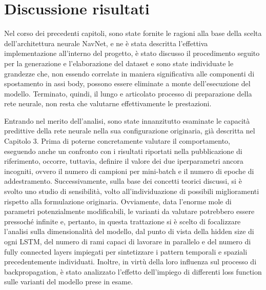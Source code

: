 
\chapter{Discussione risultati}

Nel corso dei precedenti capitoli, sono state fornite le ragioni alla base della scelta dell'architettura neurale NavNet, e ne è stata descritta l'effettiva implementazione all'interno del progetto, è stato discusso il procedimento seguito per la generazione e l'elaborazione del dataset e sono state individuate le grandezze che, non essendo correlate in maniera significativa alle componenti di spostamento in assi body, possono essere eliminate a monte dell'esecuzione del modello. Terminato, quindi, il lungo e articolato processo di preparazione della rete neurale, non resta che valutarne effettivamente le prestazioni. 

Entrando nel merito dell'analisi, sono state innanzitutto esaminate le capacità predittive della rete neurale nella sua configurazione originaria, già descritta nel Capitolo 3. Prima di poterne concretamente valutare il comportamento, eseguendo anche un confronto con i risultati riportati nella pubblicazione di riferimento, occorre, tuttavia, definire il valore dei due iperparametri ancora incogniti, ovvero il numero di campioni per mini-batch e il numero di epoche di addestramento. Successivamente, sulla base dei concetti teorici discussi, si è svolto uno studio di sensibilità, volto all'individuazione di possibili miglioramenti rispetto alla formulazione originaria. Ovviamente, data l'enorme mole di parametri potenzialmente modificabili, le varianti da valutare potrebbero essere pressoché infinite e, pertanto, in questa trattazione si è scelto di focalizzare l'analisi sulla dimensionalità del modello, dal punto di vista della hidden size di ogni LSTM, del numero di rami capaci di lavorare in parallelo e del numero di fully connected layers impiegati per sintetizzare i pattern temporali e spaziali precedentemente individuati. Inoltre, in virtù della loro influenza sul processo di backpropagation, è stato analizzato l'effetto dell'impiego di differenti loss function sulle varianti del modello prese in esame. 

